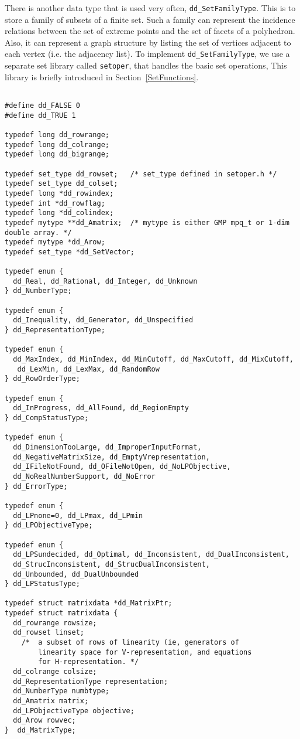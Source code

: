 \documentclass[11pt]{article}
\newcommand {\0} {{\bf 0}}
\begin{document}
There is another data type that is used very often, {\tt dd\_SetFamilyType}.
This is to store a family of subsets of a finite set.  Such a family
can represent the incidence relations between the set of extreme
points and the set of facets of a polyhedron.  Also, it can represent a
graph structure by listing the set of vertices adjacent to each vertex (i.e.
the adjacency list).   To implement  {\tt dd\_SetFamilyType},
we use  a separate set library called {\tt setoper}, that
handles the basic set operations,   This library is briefly introduced in
Section~\ref{SetFunctions}.


\begin{verbatim}

#define dd_FALSE 0
#define dd_TRUE 1

typedef long dd_rowrange;
typedef long dd_colrange;
typedef long dd_bigrange;

typedef set_type dd_rowset;   /* set_type defined in setoper.h */
typedef set_type dd_colset;
typedef long *dd_rowindex;
typedef int *dd_rowflag;
typedef long *dd_colindex;
typedef mytype **dd_Amatrix;  /* mytype is either GMP mpq_t or 1-dim double array. */
typedef mytype *dd_Arow;
typedef set_type *dd_SetVector;

typedef enum {
  dd_Real, dd_Rational, dd_Integer, dd_Unknown
} dd_NumberType;

typedef enum {
  dd_Inequality, dd_Generator, dd_Unspecified
} dd_RepresentationType;

typedef enum {
  dd_MaxIndex, dd_MinIndex, dd_MinCutoff, dd_MaxCutoff, dd_MixCutoff,
   dd_LexMin, dd_LexMax, dd_RandomRow
} dd_RowOrderType;

typedef enum {
  dd_InProgress, dd_AllFound, dd_RegionEmpty
} dd_CompStatusType;

typedef enum {
  dd_DimensionTooLarge, dd_ImproperInputFormat,
  dd_NegativeMatrixSize, dd_EmptyVrepresentation,
  dd_IFileNotFound, dd_OFileNotOpen, dd_NoLPObjective,
  dd_NoRealNumberSupport, dd_NoError
} dd_ErrorType;

typedef enum {
  dd_LPnone=0, dd_LPmax, dd_LPmin
} dd_LPObjectiveType;

typedef enum {
  dd_LPSundecided, dd_Optimal, dd_Inconsistent, dd_DualInconsistent,
  dd_StrucInconsistent, dd_StrucDualInconsistent,
  dd_Unbounded, dd_DualUnbounded
} dd_LPStatusType;

typedef struct matrixdata *dd_MatrixPtr;
typedef struct matrixdata {
  dd_rowrange rowsize;
  dd_rowset linset;
    /*  a subset of rows of linearity (ie, generators of
        linearity space for V-representation, and equations
        for H-representation. */
  dd_colrange colsize;
  dd_RepresentationType representation;
  dd_NumberType numbtype;
  dd_Amatrix matrix;
  dd_LPObjectiveType objective;
  dd_Arow rowvec;
}  dd_MatrixType;


\end{verbatim}
\end{document}
